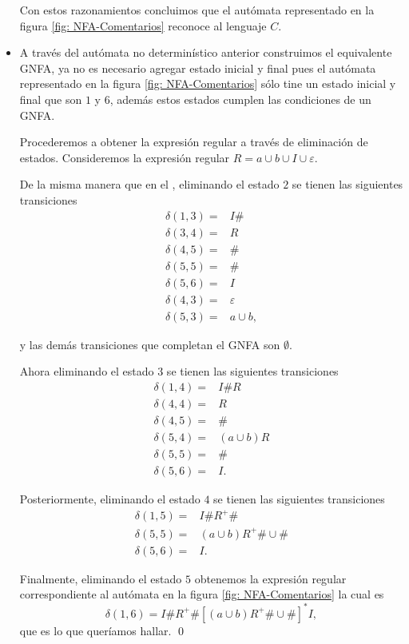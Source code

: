 \documentclass{article}
\begin{document}
\begin{itemize}
    Con estos razonamientos concluimos que el autómata representado en la figura \ref{fig: NFA-Comentarios} reconoce al lenguaje $C$.

    \item [\colemph{B)}] A través del autómata no determinístico anterior construimos el equivalente GNFA, ya no es necesario agregar estado inicial y final pues el autómata representado en la figura \ref{fig: NFA-Comentarios} sólo tine un estado inicial y final que son $1$ y $6$, además estos estados cumplen las condiciones de un GNFA.
    
    Procederemos a obtener la expresión regular a través de eliminación de estados. Consideremos la expresión regular $R=a\cup b\cup I\cup\varepsilon$.

    De la misma manera que en el , eliminando el estado $2$ se tienen las siguientes transiciones
    \begin{align*}
        \delta(1,3)=&I\#\\ 
        \delta(3,4)=&R\\ 
        \delta(4,5)=&\#\\ 
        \delta(5,5)=&\#\\ 
        \delta(5,6)=&I\\ 
        \delta(4,3)=&\varepsilon\\ 
        \delta(5,3)=&a\cup b,
    \end{align*}

    y las demás transiciones que completan el GNFA son $\emptyset$.

    Ahora eliminando el estado $3$ se tienen las siguientes transiciones
    \begin{align*}
        \delta(1,4)=&I\#R\\ 
        \delta(4,4)=&R\\ 
        \delta(4,5)=&\#\\ 
        \delta(5,4)=&(a\cup b)R\\ 
        \delta(5,5)=&\#\\ 
        \delta(5,6)=& I.
    \end{align*}

    Posteriormente, eliminando el estado $4$ se tienen las siguientes transiciones
    \begin{align*}
        \delta(1,5)=&I\# R^+\#\\ 
        \delta(5,5)=&(a\cup b)R^+\#\cup \#\\ 
        \delta(5,6)=& I.
    \end{align*}

    Finalmente, eliminando el estado $5$ obtenemos la expresión regular correspondiente al autómata en la figura \ref{fig: NFA-Comentarios} la cual es 
    \[
        \delta(1,6)=I\#R^+\#[(a\cup b)R^+\#\cup \#]^* I,  
    \]
    que es lo que queríamos hallar. \qed
\end{itemize}
\end{document}
